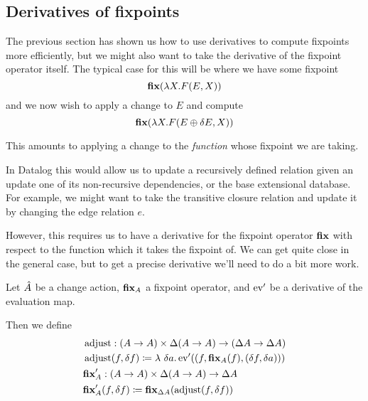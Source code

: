 \subsection{Derivatives of fixpoints}
\label{sec:fixpointDerivatives}

The previous section has shown us how to use derivatives to compute fixpoints
more efficiently, but we might also want to take the derivative of the fixpoint
operator itself. The typical case for this will be where we have some fixpoint
\begin{displaymath}
  \textbf{fix} (\lambda X . F(E, X))
\end{displaymath}
and we now wish to apply a change to $E$ and compute
\begin{displaymath}
  \textbf{fix} (\lambda X . F(E \oplus \delta E, X))
\end{displaymath}

This amounts to applying a change to the \emph{function} whose fixpoint we are taking.

In Datalog this would allow us to update a recursively defined relation given an
update one of its non-recursive dependencies, or the base extensional database.
For example, we might want to take the transitive closure relation
and update it by changing the edge relation $e$.

However, this requires us to have a derivative for the fixpoint operator
$\textbf{fix}$ with respect to the function which it takes the fixpoint of.
We can get quite close in the general case, but to get a precise
derivative we'll need to do a bit more work.

\begin{defn}
  Let $\hat{A}$ be a change action, $\textbf{fix}_A$ a fixpoint operator, and
  $\operatorname{ev}'$ be a derivative of the evaluation map.

  Then we define
  \begin{align*}
    &\operatorname{adjust} : (A \rightarrow A) \times \Delta (A \rightarrow A) \rightarrow (\Delta A \rightarrow \Delta A)\\
    &\operatorname{adjust}(f, \delta f) \coloneqq \lambda\ \delta a . \operatorname{ev}'((f,
    \textbf{fix}_A(f), (\delta f, \delta a)))\\
    &\textbf{fix}_A' : (A \rightarrow A) \times \Delta (A \rightarrow A) \rightarrow \Delta A\\
    &\textbf{fix}_A'(f, \delta f) \coloneqq \textbf{fix}_{\Delta A}(\operatorname{adjust}(f, \delta f))
  \end{align*}
\end{defn}

